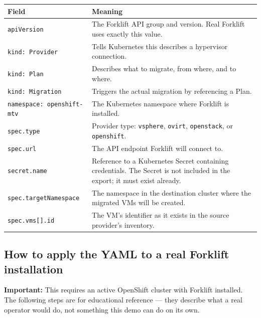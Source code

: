 \documentclass[12pt,a4paper]{article}
\begin{document}
\begin{longtable}{L{4.5cm} L{9.5cm}}
  \toprule
  \textbf{Field} & \textbf{Meaning} \\
  \midrule
  \endhead
  \texttt{apiVersion} & The Forklift API group and version. Real Forklift uses exactly this value. \\
  \texttt{kind: Provider} & Tells Kubernetes this describes a hypervisor connection. \\
  \texttt{kind: Plan} & Describes what to migrate, from where, and to where. \\
  \texttt{kind: Migration} & Triggers the actual migration by referencing a Plan. \\
  \texttt{namespace: openshift-mtv} & The Kubernetes namespace where Forklift is installed. \\
  \texttt{spec.type} & Provider type: \texttt{vsphere}, \texttt{ovirt}, \texttt{openstack}, or \texttt{openshift}. \\
  \texttt{spec.url} & The API endpoint Forklift will connect to. \\
  \texttt{secret.name} & Reference to a Kubernetes Secret containing credentials. The Secret is not included in the export; it must exist already. \\
  \texttt{spec.targetNamespace} & The namespace in the destination cluster where the migrated VMs will be created. \\
  \texttt{spec.vms[].id} & The VM's identifier as it exists in the source provider's inventory. \\
  \bottomrule
\end{longtable}

\subsection{How to apply the YAML to a real Forklift installation}

\begin{warnbox}
\textbf{Important:} This requires an active OpenShift cluster with Forklift installed. The following steps are for educational reference — they describe what a real operator would do, not something this demo can do on its own.
\end{warnbox}
\end{document}
